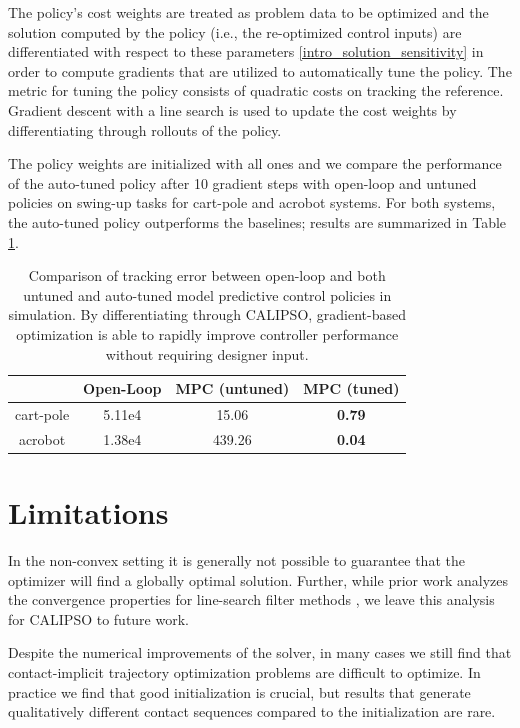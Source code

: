 The policy's cost weights are treated as problem data to be optimized and the solution computed by the policy (i.e., the re-optimized control inputs) are differentiated with respect to these parameters \eqref{intro_solution_sensitivity} in order to compute gradients that are utilized to automatically tune the policy. The metric for tuning the policy consists of quadratic costs on tracking the reference. Gradient descent with a line search is used to update the cost weights by differentiating through rollouts of the policy. 

The policy weights are initialized with all ones and we compare the performance of the auto-tuned policy after 10 gradient steps with open-loop and untuned policies on swing-up tasks for cart-pole and acrobot systems. For both systems, the auto-tuned policy outperforms the baselines; results are summarized in Table \ref{calipso_mpc_autotune}.

\begin{table}[H] 
	\centering
	\caption[Numerical results for predictive control auto-tuning]{Comparison of tracking error between open-loop and both untuned and auto-tuned model predictive control policies in simulation. By differentiating through CALIPSO, gradient-based optimization is able to rapidly improve controller performance without requiring designer input.}
	\begin{tabular}{c c c c}
		\toprule
		&
		\textbf{Open-Loop} &
		\textbf{MPC (untuned)} &
		\textbf{MPC (tuned)} \\
		\toprule
		cart-pole & 5.11e4 & 15.06 & \textbf{0.79}\\
		acrobot & 1.38e4 & 439.26 & \textbf{0.04}\\
		\toprule
	\end{tabular}
	\label{calipso_mpc_autotune}
\end{table}

\section{Limitations} \label{calipso_limitations}
In the non-convex setting it is generally not possible to guarantee that the optimizer will find a globally optimal solution. Further, while prior work analyzes the convergence properties for line-search filter methods \cite{wachter2005line}, we leave this analysis for CALIPSO to future work. 

Despite the numerical improvements of the solver, in many cases we still find that contact-implicit trajectory optimization problems are difficult to optimize. In practice we find that good initialization is crucial, but results that generate qualitatively different contact sequences compared to the initialization are rare. 

